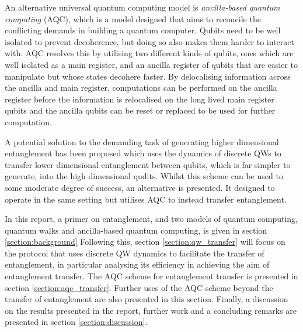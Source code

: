 An alternative universal quantum computing model is \emph{ancilla-based quantum computing} (AQC), which is a model designed that aims to reconcile the conflicting demands in building a quantum computer.
Qubits need to be well isolated to prevent decoherence, but doing so also makes them harder to interact with.
AQC resolves this by utilising two different kinds of qubits, ones which are well isolated as a main register, and an ancilla register of qubits that are easier to manipulate but whose states decohere faster.
By delocalising information across the ancilla and main register, computations can be performed on the ancilla register before the information is relocalised on the long lived main register qubits and the ancilla qubits can be reset or replaced to be used for further computation.

A potential solution to the demanding task of generating higher dimensional entanglement has been proposed \cite{giordani2020} which uses the dynamics of discrete QWs to transfer lower dimensional entanglement between qubits, which is far simpler to generate, into the high dimensional qudits.
Whilst this scheme can be used to some moderate degree of success, an alternative is presented.
It designed to operate in the same setting but utilises AQC to instead transfer entanglement.
\newline

In this report, a primer on entanglement, and two models of quantum computing, quantum walks and ancilla-based quantum computing, is given in section {\ref{section:background}}
Following this, section {\ref{section:qw_transfer}} will focus on the protocol that uses discrete QW dynamics to facilitate the transfer of entanglement, in particular analysing its efficiency in achieving the aim of entanglement transfer. 
The AQC scheme for entanglement transfer is presented in section \ref{section:aqc_transfer}. 
Further uses of the AQC scheme beyond the transfer of entanglement are also presented in this section. 
Finally, a discussion on the results presented in the report, further work and a concluding remarks are presented in section {\ref{section:discussion}}.